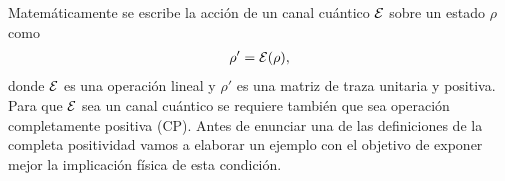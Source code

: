 Matemáticamente se escribe la acción de un canal cuántico $\mathcal{E}$ 
sobre un estado $\rho$ como
\begin{align} \label{eq:E(rho)}
\rho' = \mathcal{E} (\rho),
\end{align} 
donde $\mathcal{E}$ es una operación lineal y $\rho'$ es una matriz de
traza unitaria y positiva. Para que $\mathcal{E}$ sea un canal cuántico 
se requiere también que sea operación completamente positiva (CP). 
Antes de enunciar una de las definiciones de la completa positividad
vamos a elaborar un ejemplo con el objetivo de exponer mejor la 
implicación física de esta condición.



